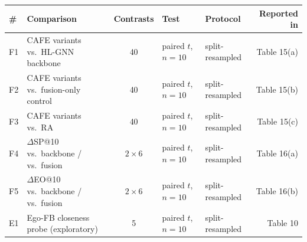 \begin{tabular}{llcllr}
\toprule
\# & Comparison & Contrasts & Test & Protocol & Reported in \\
\midrule
F1 & CAFE variants vs.\ HL-GNN backbone & 40 & paired $t$, $n=10$ & split-resampled & Table 15(a) \\
F2 & CAFE variants vs.\ fusion-only control & 40 & paired $t$, $n=10$ & split-resampled & Table 15(b) \\
F3 & CAFE variants vs.\ RA & 40 & paired $t$, $n=10$ & split-resampled & Table 15(c) \\
F4 & $\Delta$SP@10 vs.\ backbone / vs.\ fusion & $2\times6$ & paired $t$, $n=10$ & split-resampled & Table 16(a) \\
F5 & $\Delta$EO@10 vs.\ backbone / vs.\ fusion & $2\times6$ & paired $t$, $n=10$ & split-resampled & Table 16(b) \\
E1 & Ego-FB closeness probe (exploratory) & 5 & paired $t$, $n=10$ & split-resampled & Table 10 \\
\bottomrule
\end{tabular}
